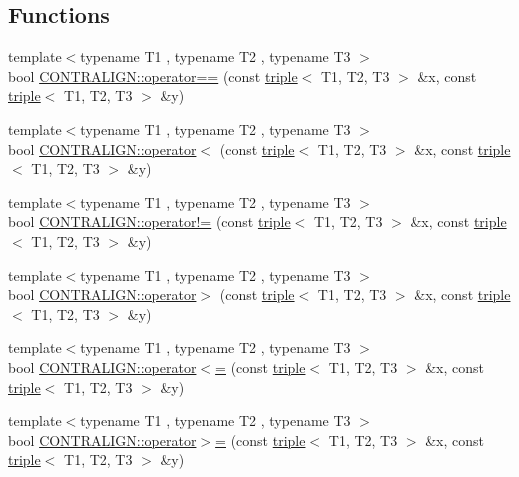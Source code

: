 \subsection*{Functions}
\begin{DoxyCompactItemize}
\item 
{\footnotesize template$<$typename T1 , typename T2 , typename T3 $>$ }\\bool \hyperlink{namespace_c_o_n_t_r_a_l_i_g_n_aed9c0b72e8f62195682d84fb809bed28}{C\+O\+N\+T\+R\+A\+L\+I\+G\+N\+::operator==} (const \hyperlink{structtriple}{triple}$<$ T1, T2, T3 $>$ \&x, const \hyperlink{structtriple}{triple}$<$ T1, T2, T3 $>$ \&y)
\item 
{\footnotesize template$<$typename T1 , typename T2 , typename T3 $>$ }\\bool \hyperlink{namespace_c_o_n_t_r_a_l_i_g_n_a00533aeff74d4937d55fc5325493000a}{C\+O\+N\+T\+R\+A\+L\+I\+G\+N\+::operator$<$} (const \hyperlink{structtriple}{triple}$<$ T1, T2, T3 $>$ \&x, const \hyperlink{structtriple}{triple}$<$ T1, T2, T3 $>$ \&y)
\item 
{\footnotesize template$<$typename T1 , typename T2 , typename T3 $>$ }\\bool \hyperlink{namespace_c_o_n_t_r_a_l_i_g_n_a18792ba6906e25c2178227113f998924}{C\+O\+N\+T\+R\+A\+L\+I\+G\+N\+::operator!=} (const \hyperlink{structtriple}{triple}$<$ T1, T2, T3 $>$ \&x, const \hyperlink{structtriple}{triple}$<$ T1, T2, T3 $>$ \&y)
\item 
{\footnotesize template$<$typename T1 , typename T2 , typename T3 $>$ }\\bool \hyperlink{namespace_c_o_n_t_r_a_l_i_g_n_ae3eb2ccb80d117e609ecc584ca71181f}{C\+O\+N\+T\+R\+A\+L\+I\+G\+N\+::operator$>$} (const \hyperlink{structtriple}{triple}$<$ T1, T2, T3 $>$ \&x, const \hyperlink{structtriple}{triple}$<$ T1, T2, T3 $>$ \&y)
\item 
{\footnotesize template$<$typename T1 , typename T2 , typename T3 $>$ }\\bool \hyperlink{namespace_c_o_n_t_r_a_l_i_g_n_a8d549020d197328238ec07aec158d838}{C\+O\+N\+T\+R\+A\+L\+I\+G\+N\+::operator$<$=} (const \hyperlink{structtriple}{triple}$<$ T1, T2, T3 $>$ \&x, const \hyperlink{structtriple}{triple}$<$ T1, T2, T3 $>$ \&y)
\item 
{\footnotesize template$<$typename T1 , typename T2 , typename T3 $>$ }\\bool \hyperlink{namespace_c_o_n_t_r_a_l_i_g_n_af2698ca3552c349853f1d45c74399d52}{C\+O\+N\+T\+R\+A\+L\+I\+G\+N\+::operator$>$=} (const \hyperlink{structtriple}{triple}$<$ T1, T2, T3 $>$ \&x, const \hyperlink{structtriple}{triple}$<$ T1, T2, T3 $>$ \&y)

\end{DoxyCompactItemize}
